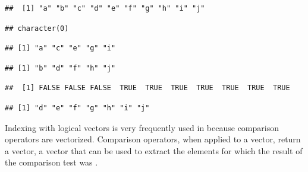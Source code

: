 \documentclass[krantz2]{krantz}\usepackage{knitr}
\begin{document}
\begin{knitrout}\footnotesize
{}\color{fgcolor}\begin{kframe}
\begin{alltt}
\hlstd{a[}\hlstd{]}
\end{alltt}
\begin{verbatim}
##  [1] "a" "b" "c" "d" "e" "f" "g" "h" "i" "j"
\end{verbatim}
\begin{alltt}
\hlstd{a[}\hlstd{]}
\end{alltt}
\begin{verbatim}
## character(0)
\end{verbatim}
\begin{alltt}
\hlstd{a[}\hlstd{(}\hlstd{,} \hlstd{)]}
\end{alltt}
\begin{verbatim}
## [1] "a" "c" "e" "g" "i"
\end{verbatim}
\begin{alltt}
\hlstd{a[}\hlstd{(}\hlstd{,} \hlstd{)]}
\end{alltt}
\begin{verbatim}
## [1] "b" "d" "f" "h" "j"
\end{verbatim}
\begin{alltt}
 \hlopt{>} 
\end{alltt}
\begin{verbatim}
##  [1] FALSE FALSE FALSE  TRUE  TRUE  TRUE  TRUE  TRUE  TRUE  TRUE
\end{verbatim}
\begin{alltt}
\hlstd{a[a} \hlopt{>} \hlstd{]}
\end{alltt}
\begin{verbatim}
## [1] "d" "e" "f" "g" "h" "i" "j"
\end{verbatim}
\end{kframe}
\end{knitrout}

Indexing with logical vectors is very frequently used in \Rlang because comparison operators are vectorized. Comparison operators, when applied to a vector, return a  vector, a vector that can be used to extract the elements for which the result of the comparison test was .
\end{document}
